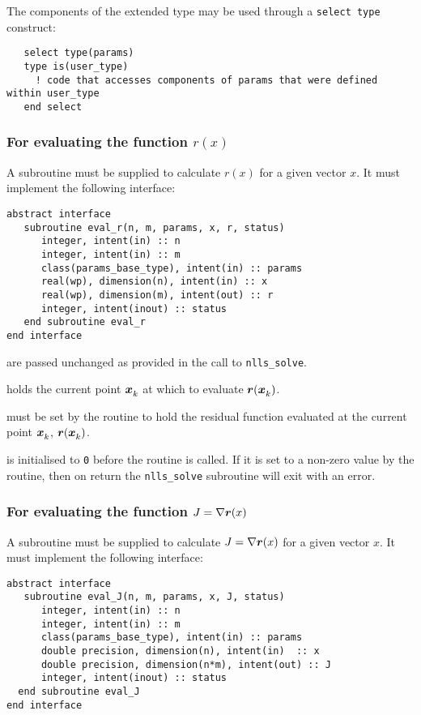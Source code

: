 \documentclass{spec}
\begin{document}
The components of the extended type may be used through a \texttt{select type}
construct:
\begin{verbatim}
   select type(params)
   type is(user_type)
     ! code that accesses components of params that were defined within user_type
   end select
\end{verbatim}

\subsubsection{For evaluating the function $r(x)$}
A subroutine must be supplied to calculate $r(x)$ for a given vector $x$. It
must implement the following interface:

\begin{verbatim}
abstract interface
   subroutine eval_r(n, m, params, x, r, status)
      integer, intent(in) :: n
      integer, intent(in) :: m
      class(params_base_type), intent(in) :: params
      real(wp), dimension(n), intent(in) :: x
      real(wp), dimension(m), intent(out) :: r
      integer, intent(inout) :: status
   end subroutine eval_r
end interface
\end{verbatim}

\begin{description}
    are passed unchanged as provided in the call to
      {\tt nlls\_solve}.

       holds the current point ${\bm x}_{k}^{}$ at which to evaluate ${\bm r}({\bm x}_{k}^{})$.

    must be set by the routine to hold the residual function
      evaluated at the current point ${\bm x}_{k}^{}$, ${\bm r}({\bm x}_{k}^{})$.

    is initialised to \texttt{0} before the routine is
      called. If it is set to a non-zero value by the routine, then on return
      the {\tt nlls\_solve} subroutine will exit with an error.
\end{description}

\subsubsection{For evaluating the function $J = \nabla {\bm r}(x)$}
A subroutine must be supplied to calculate $J = \nabla {\bm r}(x)$ for a given vector $x$. It
must implement the following interface:

\begin{verbatim}
abstract interface
   subroutine eval_J(n, m, params, x, J, status)
      integer, intent(in) :: n
      integer, intent(in) :: m
      class(params_base_type), intent(in) :: params
      double precision, dimension(n), intent(in)  :: x
      double precision, dimension(n*m), intent(out) :: J
      integer, intent(inout) :: status
  end subroutine eval_J
end interface
\end{verbatim}
\end{document}
